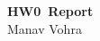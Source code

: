 \documentclass[11pt]{article}
\begin{document}
\thispagestyle{empty}

\begin{center}
\large{\textbf{HW0~Report}}\\ \vspace{2mm}
\normalsize Manav Vohra
\end{center}


%
%
\end{document}
